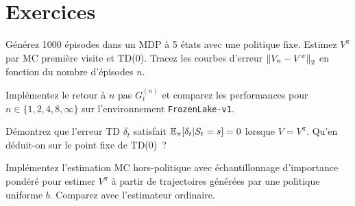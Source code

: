 \section{Exercices}

\begin{exercice}[Variance MC vs TD]
G\'en\'erez 1000 \'episodes dans un MDP \`a 5 \'etats avec une politique fixe.
Estimez $V^\pi$ par MC premi\`ere visite et TD(0). Tracez les courbes d'erreur
$\left\| V_n - V^\pi \right\|_2$ en fonction du nombre d'\'episodes $n$.
\end{exercice}

\begin{exercice}
Impl\'ementez le retour \`a $n$ pas $G_t^{(n)}$ et comparez les performances
pour $n \in \{1, 2, 4, 8, \infty\}$ sur l'environnement \texttt{FrozenLake-v1}.
\end{exercice}

\begin{exercice}
D\'emontrez que l'erreur TD $\delta_t$ satisfait $\mathbb{E}_\pi[\delta_t | S_t = s] = 0$
lorsque $V = V^\pi$. Qu'en d\'eduit-on sur le point fixe de TD(0)~?
\end{exercice}

\begin{exercice}
Impl\'ementez l'estimation MC hors-politique avec \'echantillonnage d'importance
pond\'er\'e pour estimer $V^\pi$ \`a partir de trajectoires g\'en\'er\'ees par
une politique uniforme $b$. Comparez avec l'estimateur ordinaire.
\end{exercice}
